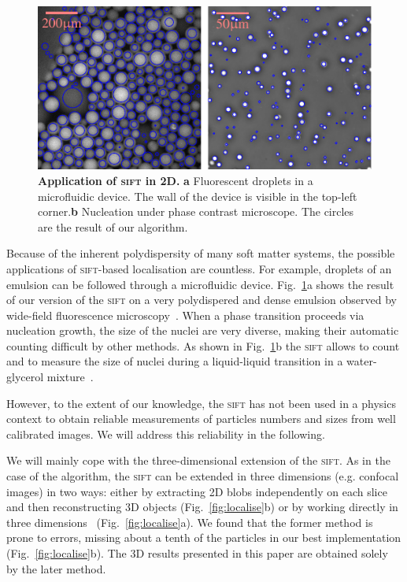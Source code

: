 \documentclass[8.5pt,twoside,twocolumn]{article}
\begin{document}
\begin{figure}
	\centering
	\includegraphics{fig_applications.pdf}
	\caption{\textbf{Application of \textsc{sift} in 2D.} \textbf{a} Fluorescent droplets in a microfluidic device. The wall of the device is visible in the top-left corner.\textbf{b} Nucleation under phase contrast microscope. The circles are the result of our algorithm.}
	\label{fig:applications}
\end{figure}

Because of the inherent polydispersity of many soft matter systems, the possible applications of \textsc{sift}-based localisation are countless. For example, droplets of an emulsion can be followed through a microfluidic device. Fig.~\ref{fig:applications}a shows the result of our version of the \textsc{sift} on a very polydispered and dense emulsion observed by wide-field fluorescence microscopy~\cite{Montagne2011}. When a phase transition proceeds via nucleation growth, the size of the nuclei are very diverse, making their automatic counting difficult by other methods. As shown in Fig.~\ref{fig:applications}b the \textsc{sift} allows to count and to measure the size of nuclei during a liquid-liquid transition in a water-glycerol mixture~\cite{Murata2012}.

However, to the extent of our knowledge, the \textsc{sift} has not been used in a physics context to obtain reliable measurements of particles numbers and sizes from well calibrated images. We will address this reliability in the following.

We will mainly cope with the three-dimensional extension of the \textsc{sift}. As in the case of the \citet{Crocker1996} algorithm, the \textsc{sift} can be extended in three dimensions (e.g. confocal images) in two ways: either by extracting 2D blobs independently on each slice and then reconstructing 3D objects (Fig.~\ref{fig:localise}b) or by working directly in three dimensions~\cite{Urschler2006, Cheung2009} (Fig.~\ref{fig:localise}a). We found that the former method is prone to errors, missing about a tenth of the particles in our best implementation (Fig.~\ref{fig:localise}b). The 3D results presented in this paper are obtained solely by the later method.
\end{document}

